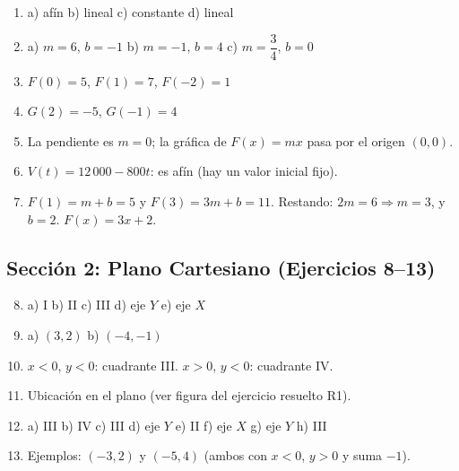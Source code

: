 \documentclass[12pt, letterpaper]{article}
\begin{document}
  \begin{enumerate}[leftmargin=*, label=\textbf{\arabic*.}]
    \item a) afín \quad b) lineal \quad c) constante \quad d) lineal

    \item a) $m = 6$, $b = -1$ \quad b) $m = -1$, $b = 4$ \quad c) $m = \dfrac{3}{4}$, $b = 0$

    \item $F(0) = 5$, $F(1) = 7$, $F(-2) = 1$

    \item $G(2) = -5$, $G(-1) = 4$

    \item La pendiente es $m = 0$; la gráfica de $F(x) = mx$ pasa por el origen $(0, 0)$.

    \item $V(t) = 12\,000 - 800t$: es afín (hay un valor inicial fijo).

    \item $F(1) = m + b = 5$ y $F(3) = 3m + b = 11$. Restando: $2m = 6 \Rightarrow m = 3$, y $b = 2$. $F(x) = 3x + 2$.
  \end{enumerate}

  \newpage

  \subsection*{Sección 2: Plano Cartesiano (Ejercicios 8--13)}

  \begin{enumerate}[leftmargin=*, label=\textbf{\arabic*.}]
    \setcounter{enumi}{7}
    \item a) I \quad b) II \quad c) III \quad d) eje $Y$ \quad e) eje $X$

    \item a) $(3, 2)$ \quad b) $(-4, -1)$

    \item $x<0$, $y<0$: cuadrante III. $x>0$, $y<0$: cuadrante IV.

    \item Ubicación en el plano (ver figura del ejercicio resuelto R1).

    \item a) III \quad b) IV \quad c) III \quad d) eje $Y$ \quad e) II \quad f) eje $X$ \quad g) eje $Y$ \quad h) III

    \item Ejemplos: $(-3, 2)$ y $(-5, 4)$ (ambos con $x<0$, $y>0$ y suma $-1$).
  \end{enumerate}
\end{document}

